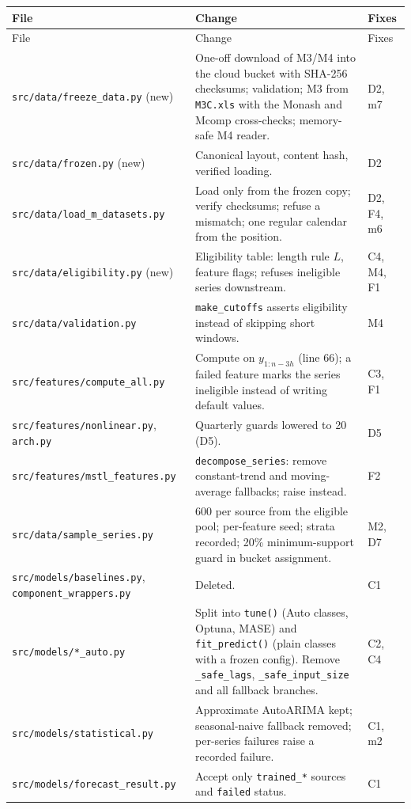 \documentclass[11pt,a4paper]{article}
\newcommand{\code}[1]{\texttt{#1}}
\begin{document}
{\small
\begin{longtable}{@{}p{4.6cm} p{7.4cm} p{3.3cm}@{}}
\toprule
File & Change & Fixes \\
\midrule
\endfirsthead
\toprule
File & Change & Fixes \\
\midrule
\endhead
\bottomrule
\endfoot
\code{src/data/freeze_data.py} (new) & One-off download of M3/M4 into the cloud bucket with SHA-256 checksums; validation; M3 from \code{M3C.xls} with the Monash and Mcomp cross-checks; memory-safe M4 reader. & D2, m7 \\
\code{src/data/frozen.py} (new) & Canonical layout, content hash, verified loading. & D2 \\
\code{src/data/load_m_datasets.py} & Load only from the frozen copy; verify checksums; refuse a mismatch; one regular calendar from the position. & D2, F4, m6 \\
\code{src/data/eligibility.py} (new) & Eligibility table: length rule $L$, feature flags; refuses ineligible series downstream. & C4, M4, F1 \\
\code{src/data/validation.py} & \code{make_cutoffs} asserts eligibility instead of skipping short windows. & M4 \\
\code{src/features/compute_all.py} & Compute on $y_{1:n-3h}$ (line 66); a failed feature marks the series ineligible instead of writing default values. & C3, F1 \\
\code{src/features/nonlinear.py}, \code{arch.py} & Quarterly guards lowered to 20 (D5). & D5 \\
\code{src/features/mstl_features.py} & \code{decompose_series}: remove constant-trend and moving-average fallbacks; raise instead. & F2 \\
\code{src/data/sample_series.py} & 600 per source from the eligible pool; per-feature seed; strata recorded; 20\% minimum-support guard in bucket assignment. & M2, D7 \\
\code{src/models/baselines.py}, \code{component_wrappers.py} & Deleted. & C1 \\
\code{src/models/*_auto.py} & Split into \code{tune()} (Auto classes, Optuna, MASE) and \code{fit_predict()} (plain classes with a frozen config). Remove \code{_safe_lags}, \code{_safe_input_size} and all fallback branches. & C2, C4 \\
\code{src/models/statistical.py} & Approximate AutoARIMA kept; seasonal-naive fallback removed; per-series failures raise a recorded failure. & C1, m2 \\
\code{src/models/forecast_result.py} & Accept only \code{trained_*} sources and \code{failed} status. & C1 \\

\end{longtable}}
\end{document}
